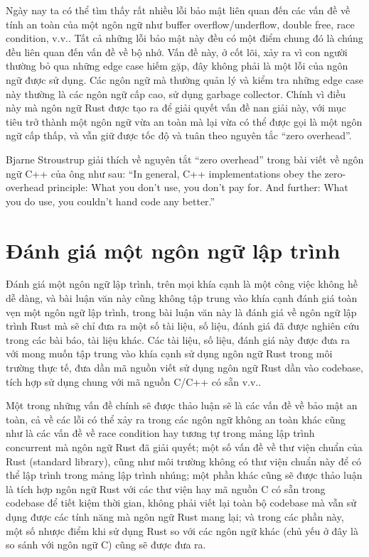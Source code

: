 Ngày nay ta có thể tìm thấy rất nhiều lỗi bảo mật liên quan đến các vấn đề về tính an toàn của một ngôn ngữ như buffer overflow/underflow, double free, race condition, v.v.. Tất cả những lỗi bảo mật này đều có một điểm chung đó là chúng đều liên quan đến vấn đề về bộ nhớ. Vấn đề này, ở cốt lõi, xảy ra vì con người thường bỏ qua những edge case hiếm gặp, đây không phải là một lỗi của ngôn ngữ được sử dụng. Các ngôn ngữ mà thường quản lý và kiểm tra những edge case này thường là các ngôn ngữ cấp cao, sử dụng garbage collector. Chính vì điều này mà ngôn ngữ Rust được tạo ra để giải quyết vấn đề nan giải này, với mục tiêu trở thành một ngôn ngữ vừa an toàn mà lại vừa có thể được gọi là một ngôn ngữ cấp thấp, và vẫn giữ được tốc độ và tuân theo nguyên tắc ``zero overhead''.

Bjarne Stroustrup giải thích về nguyên tắt ``zero overhead'' trong bài viết về ngôn ngữ C++ của ông như sau: ``In general, C++ implementations obey the zero-overhead principle: What you don’t use, you don’t pay for. And further: What you do use, you couldn’t hand code any better.''


\section{Đánh giá một ngôn ngữ lập trình}
Đánh giá một ngôn ngữ lập trình, trên mọi khía cạnh là một công việc không hề dễ dàng, và bài luận văn này cũng không tập trung vào khía cạnh đánh giá toàn vẹn một ngôn ngữ lập trình, trong bài luận văn này là đánh giá về ngôn ngữ lập trình Rust mà sẽ chỉ đưa ra một số tài liệu, số liệu, đánh giá đã được nghiên cứu trong các bài báo, tài liệu khác.
Các tài liệu, số liệu, đánh giá này được đưa ra với mong muốn tập trung vào khía cạnh sử dụng ngôn ngữ Rust trong môi trường thực tế, đưa dần mã nguồn viết sử dụng ngôn ngữ Rust dần vào codebase, tích hợp sử dụng chung với mã nguồn C/C++ có sẵn v.v..

Một trong những vấn đề chính sẽ được thảo luận sẽ là các vấn đề về bảo mật an toàn, cả về các lỗi có thể xảy ra trong các ngôn ngữ không an toàn khác cũng như là các vấn đề về race condition hay tương tự trong mảng lập trình concurrent mà ngôn ngữ Rust đã giải quyết; một số vấn đề về thư viện chuẩn của Rust (standard library), cũng như môi trường không có thư viện chuẩn này để có thể lập trình trong mảng lập trình nhúng; một phần khác cũng sẽ được thảo luận là tích hợp ngôn ngữ Rust với các thư viện hay mã nguồn C có sẵn trong codebase để tiết kiệm thời gian, không phải viết lại toàn bộ codebase mà vẫn sử dụng được các tính năng mà ngôn ngữ Rust mang lại; và trong các phần này, một số nhược điểm khi sử dụng Rust so với các ngôn ngữ khác (chủ yếu ở đây là so sánh với ngôn ngữ C) cũng sẽ được đưa ra.


